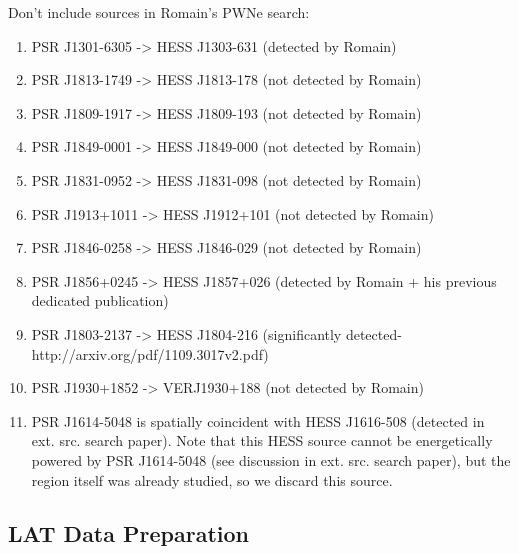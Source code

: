 Don't include sources in Romain's PWNe search:
\begin{enumerate}
  \item PSR J1301-6305 -> HESS J1303-631 (detected by Romain)
  \item PSR J1813-1749 -> HESS J1813-178 (not detected by Romain)
  \item PSR J1809-1917 -> HESS J1809-193 (not detected by Romain)
  \item PSR J1849-0001 -> HESS J1849-000 (not detected by Romain)
  \item PSR J1831-0952 -> HESS J1831-098 (not detected by Romain)
  \item PSR J1913+1011 -> HESS J1912+101 (not detected by Romain)
  \item PSR J1846-0258 -> HESS J1846-029 (not detected by Romain)
  \item PSR J1856+0245 -> HESS J1857+026 (detected by Romain + his previous dedicated publication)
  \item PSR J1803-2137 -> HESS J1804-216 (significantly detected-http://arxiv.org/pdf/1109.3017v2.pdf)
  \item PSR J1930+1852 -> VERJ1930+188 (not detected by Romain)
  \item PSR J1614-5048 is spatially coincident with HESS J1616-508 (detected in ext. src. search paper).
    Note that this HESS source cannot be energetically powered by
    PSR J1614-5048 (see discussion in ext. src. search paper), but
    the region itself was already studied, so we discard this source.



\end{enumerate}

\subsection{LAT Data Preparation}
